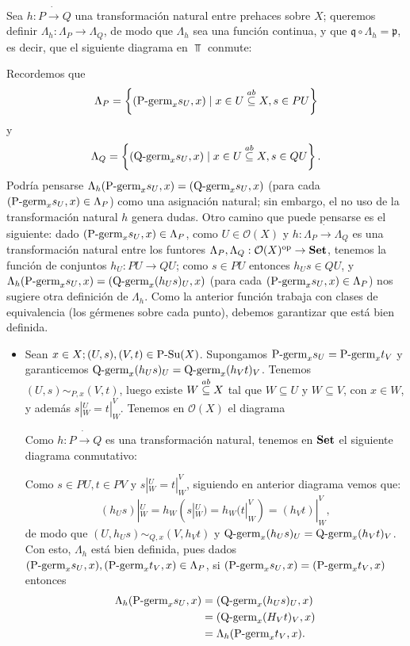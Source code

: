 Sea $h:P\dot{\to}Q$ una transformación natural entre prehaces sobre $X$; queremos definir $\Lambda_h:\Lambda_{P}\to\Lambda_{Q}$, de modo que $\Lambda_h$ sea una función continua, y que $\mathfrak{q}\circ\Lambda_h=\mathfrak{p}$, es decir, que el siguiente diagrama en $\Top$ conmute:

Recordemos que 
$$
   \Lambda_P=\left\lbrace (\normalfont{\text{P-germ}}_{x}s_{U},x)\mid x\in U\stackrel{ab}{\subseteq} X, s\in PU\right\rbrace
$$
y
$$
   \Lambda_Q=\left\lbrace (\normalfont{\text{Q-germ}}_{x}s_{U},x)\mid x\in U\stackrel{ab}{\subseteq} X, s\in QU\right\rbrace.
$$
Podría pensarse $\Lambda_h(\normalfont{\text{P-germ}}_{x}s_{U},x)=(\normalfont{\text{Q-germ}}_{x}s_{U},x)$ (para cada $(\normalfont{\text{P-germ}}_{x}s_{U},x)\in\Lambda_P$) como una asignación natural; sin embargo, el no uso de la transformación natural $h$ genera dudas. Otro camino que puede pensarse es el siguiente: dado $(\normalfont{\text{P-germ}}_{x}s_{U},x)\in \Lambda_P$, como $U\in\mathcal{O}(X)$ y $h:\Lambda_P\dot{\to}\Lambda_Q$ es una transformación natural entre los funtores $\Lambda_P,\Lambda_Q:\mathcal{O}(X)^{\text{op}}\to\normalfont{\textbf{Set}}$, tenemos la función de conjuntos $h_{U}:PU\to QU$; como $s\in PU$ entonces $h_{U}s\in QU$, y $\Lambda_h(\normalfont{\text{P-germ}}_{x}s_{U},x)=(\normalfont{\text{Q-germ}}_{x}(h_{U}s)_{U},x)$ (para cada $(\normalfont{\text{P-germ}}_{x}s_{U},x)\in\Lambda_P$) nos sugiere otra definición de $\Lambda_h$. Como la anterior función trabaja con clases de equivalencia (los gérmenes sobre cada punto), debemos garantizar que está bien definida. 
\begin{itemize}
   \item Sean $x\in X; (U,s),(V,t)\in\normalfont{\text{P-Su}}(X)$. Supongamos $\normalfont{\text{P-germ}}_{x}s_{U}=\normalfont{\text{P-germ}}_{x}t_{V}$ y garanticemos $\normalfont{\text{Q-germ}}_{x}(h_{U}s)_{U}=\normalfont{\text{Q-germ}}_{x}(h_{V}t)_{V}$. Tenemos $(U,s)\sim_{P,x}(V,t)$, luego existe $W\stackrel{ab}{\subseteq} X$ tal que $W\subseteq U$ y $W\subseteq V$, con $x\in W$, y además $s|^{U}_{W}=t|^{V}_{W}$. Tenemos en $\mathcal{O}(X)$ el diagrama
      
      Como $h:P\dot{\to} Q$ es una transformación natural, tenemos en $\normalfont{\textbf{Set}}$ el siguiente diagrama conmutativo:
      
      Como $s\in PU, t\in PV$ y $s|^{U}_{W}=t|^{V}_{W}$, siguiendo en anterior diagrama vemos que:
      $$
         (h_{U}s)|^{U}_{W}=h_{W}(s|^{U}_{W})=h_{W}(t|^{V}_{W})=(h_{V}t)|^{V}_{W},
      $$
      de modo que $(U,h_{U}s)\sim_{Q,x}(V,h_{V}t)$ y $\normalfont{\text{Q-germ}}_{x}(h_{U}s)_{U}=\normalfont{\text{Q-germ}}_{x}(h_{V}t)_{V}$. Con esto, $\Lambda_h$ está bien definida, pues dados $(\normalfont{\text{P-germ}}_{x}s_{U},x),(\normalfont{\text{P-germ}}_{x}t_{V},x)\in\Lambda_P$, si $(\normalfont{\text{P-germ}}_{x}s_{U},x)=(\normalfont{\text{P-germ}}_{x}t_{V},x)$ entonces
      $$
      \begin{aligned}
         \Lambda_h(\normalfont{\text{P-germ}}_{x}s_{U},x)&=(\normalfont{\text{Q-germ}}_{x}(h_{U}s)_{U},x)\\
                                     &=(\normalfont{\text{Q-germ}}_{x}(H_{V}t)_{V},x)\\
                                     &=\Lambda_h(\normalfont{\text{P-germ}}_{x}t_{V},x).
      \end{aligned}
      $$
\end{itemize}
